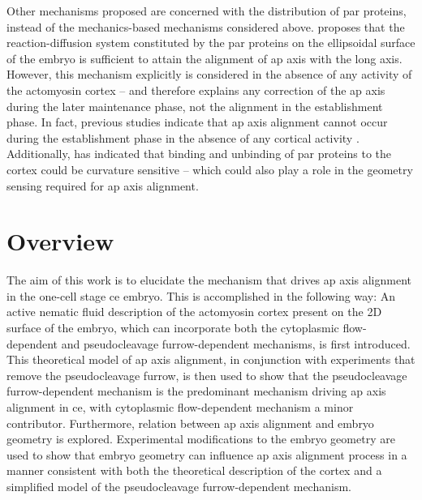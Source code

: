 Other mechanisms proposed are concerned with the distribution of \ac{par} proteins, instead of the mechanics-based mechanisms considered above. \cite{gessele2020geometric} proposes that the reaction-diffusion system constituted by the \ac{par} proteins on the ellipsoidal surface of the embryo is sufficient to attain the alignment of \ac{ap} axis with the long axis. However, this mechanism explicitly is considered in the absence of any activity of the actomyosin cortex -- and therefore explains any correction of the \ac{ap} axis during the later maintenance phase, not the alignment in the establishment phase. In fact, previous studies indicate that \ac{ap} axis alignment cannot occur during the establishment phase in the absence of any cortical activity \citep{zonies2010symmetry,motegi2011microtubules,tse2012nop1}. Additionally, \citep{klinkert2019aurora} has indicated that binding and unbinding of \ac{par} proteins to the cortex could be curvature sensitive -- which could also play a role in the geometry sensing required for \ac{ap} axis alignment.

\section{Overview}\label{sec:ApAxisOverview}
The aim of this work is to elucidate the mechanism that drives \ac{ap} axis alignment in the one-cell stage \ac{ce} embryo. This is accomplished in the following way: An active nematic fluid description of the actomyosin cortex present on the 2D surface of the embryo, which can incorporate both the cytoplasmic flow-dependent and pseudocleavage furrow-dependent mechanisms, is first introduced. This theoretical model of \ac{ap} axis alignment, in conjunction with experiments that remove the pseudocleavage furrow, is then used to show that the pseudocleavage furrow-dependent mechanism is the predominant mechanism driving \ac{ap} axis alignment in \ac{ce}, with cytoplasmic flow-dependent mechanism a minor contributor. Furthermore, relation between \ac{ap} axis alignment and embryo geometry is explored. Experimental modifications to the embryo geometry are used to show that embryo geometry can influence \ac{ap} axis alignment process in a manner consistent with both the theoretical description of the cortex and a simplified model of the pseudocleavage furrow-dependent mechanism. 

